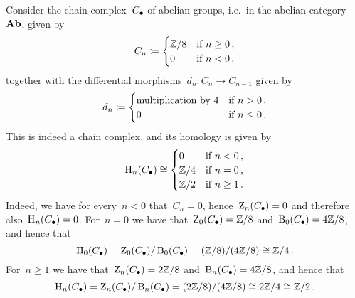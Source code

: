 \begin{example}
  Consider the chain complex~$C_\bullet$ of abelian groups, i.e.\ in the abelian category~$\mathbf{Ab}$, given by
  \[
              C_n
    \coloneqq  \begin{cases}
                \mathbb{Z}/8  & \text{if~$n \geq 0$}  \,, \\
                0           & \text{if~$n < 0$} \,,
              \end{cases}
  \]
  together with the differential morphisms~$d_n \colon C_n \to C_{n-1}$ given by
  \[
              d_n
    \coloneqq  \begin{cases}
                \text{multiplication by~$4$}  & \text{if~$n > 0$} \,, \\
                0                             & \text{if~$n \leq 0$}  \,.
              \end{cases}
  \]
  This is indeed a chain complex, and its homology is given by
  \[
          \operatorname{H}_n(C_\bullet)
    \cong \begin{cases}
            0           & \text{if~$n < 0$}     \,, \\
            \mathbb{Z}/4  & \text{if~$n = 0$}     \,, \\
            \mathbb{Z}/2  & \text{if~$n \geq 1$}  \,. \\
          \end{cases}
  \]
  Indeed, we have for every~$n < 0$ that~$C_n = 0$, hence~$\operatorname{Z}_n(C_\bullet) = 0$ and therefore also~$\operatorname{H}_n(C_\bullet) = 0$.
  For~$n = 0$ we have that~$\operatorname{Z}_0(C_\bullet) = \mathbb{Z}/8$ and~$\operatorname{B}_0(C_\bullet) = 4\mathbb{Z}/8$, and hence that
  \[
          \operatorname{H}_0(C_\bullet)
    =     \operatorname{Z}_0(C_\bullet) / \operatorname{B}_0(C_\bullet)
    =     (\mathbb{Z}/8) / (4\mathbb{Z}/8)
    \cong \mathbb{Z}/4 \,.
  \]
  For~$n \geq 1$ we have that~$\operatorname{Z}_n(C_\bullet) = 2\mathbb{Z}/8$ and~$\operatorname{B}_n(C_\bullet) = 4\mathbb{Z}/8$, and hence that
  \[
          \operatorname{H}_n(C_\bullet)
    =     \operatorname{Z}_n(C_\bullet) / \operatorname{B}_n(C_\bullet)
    =     (2 \mathbb{Z}/8) / (4\mathbb{Z}/8)
    \cong 2\mathbb{Z}/4
    \cong \mathbb{Z}/2 \,.
  \]
\end{example}


